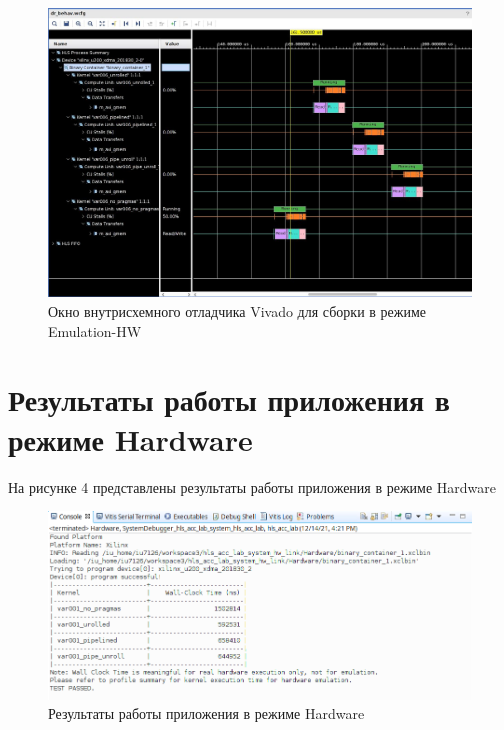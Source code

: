 \FloatBarrier
\begin{figure}[h]
	\begin{center}
		\includegraphics[width=\linewidth]{inc/vivado.png}
	\end{center}
	\caption{Окно внутрисхемного отладчика Vivado для сборки в режиме Emulation-HW}
\end{figure}
\FloatBarrier

\section*{Результаты работы приложения в режиме \newline Hardware}
На рисунке 4 представлены результаты работы приложения в режиме Hardware

\FloatBarrier
\begin{figure}[h]
	\begin{center}
		\includegraphics[width=\linewidth]{inc/hardware_result.png}
	\end{center}
	\caption{Результаты работы приложения в режиме Hardware}
\end{figure}
\FloatBarrier

